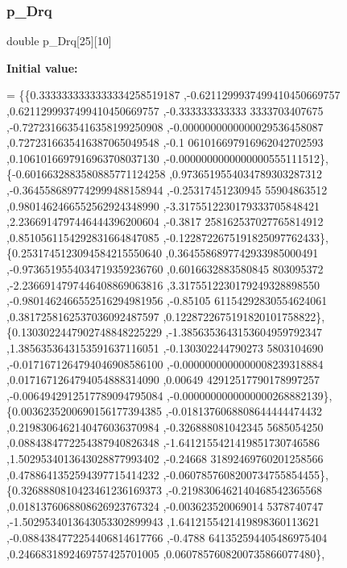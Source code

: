 \mbox{\label{a00452_ab1a57396b40c133f9233c5bbc4223d8d}} 
\subsubsection{\texorpdfstring{p\+\_\+\+Drq}{p\_Drq}}
{\footnotesize\ttfamily double p\+\_\+\+Drq\mbox{[}25\mbox{]}\mbox{[}10\mbox{]}}

{\bfseries Initial value\+:}
\begin{DoxyCode}
= \{\{0.3333333333333334258519187 ,-0.6211299937499410450669757 ,0.6211299937499410450669757 ,-0.333333333333
      3333703407675 ,-0.7272316635416358199250908 ,-0.0000000000000029536458087 ,0.7272316635416387065049548 ,-0.1
      061016697916962042702593 ,0.1061016697916963708037130 ,-0.0000000000000000555111512\},
\{-0.6016632883580885771124258 ,0.9736519554034789303287312 ,-0.3645586897742999488158944 ,-0.25317451230945
      55904863512 ,0.9801462466552562924348990 ,-3.3175512230179333705848421 ,2.2366914797446444396200604 ,-0.3817
      258162537027765814912 ,0.8510561154292831664847085 ,-0.1228722675191825097762433\},
\{0.2531745123094584215550640 ,0.3645586897742933985000491 ,-0.9736519554034719359236760 ,0.6016632883580845
      803095372 ,-2.2366914797446408869063816 ,3.3175512230179249328898550 ,-0.9801462466552516294981956 ,-0.85105
      61154292830554624061 ,0.3817258162537036092487597 ,0.1228722675191820101758822\},
\{0.1303022447902748848225229 ,-1.3856353643153604959792347 ,1.3856353643153591637116051 ,-0.130302244790273
      5803104690 ,-0.0171671264794046908586100 ,-0.0000000000000008239318884 ,0.0171671264794054888314090 ,0.00649
      42912517790178997257 ,-0.0064942912517789094795084 ,-0.0000000000000000268882139\},
\{0.0036235200690156177394385 ,-0.0181376068808644444474432 ,0.2198306462140476036370984 ,-0.326888081042345
      5685054250 ,0.0884384772254387940826348 ,-1.6412155421419851730746586 ,1.5029534013643028877993402 ,-0.24668
      31892469760201258566 ,0.4788641352594397715414232 ,-0.0607857608200734755854455\},
\{0.3268880810423461236169373 ,-0.2198306462140468542365568 ,0.0181376068808626923767324 ,-0.003623520069014
      5378740747 ,-1.5029534013643053302899943 ,1.6412155421419898360113621 ,-0.0884384772254406814617766 ,-0.4788
      641352594405486975404 ,0.2466831892469757425701005 ,0.0607857608200735866077480\},

\end{DoxyCode}
